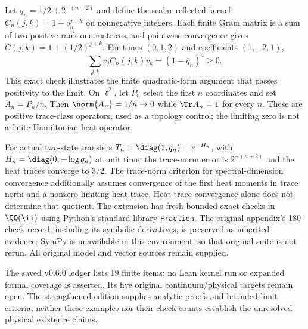 Let $q_n=1/2+2^{-(n+2)}$ and define the scalar reflected kernel $C_n(j,k)=1+q_n^{j+k}$ on nonnegative integers. Each finite Gram matrix is a sum of two positive rank-one matrices, and pointwise convergence gives $C(j,k)=1+(1/2)^{j+k}$. For times $(0,1,2)$ and coefficients $(1,-2,1)$,
\[
\sum_{j,k}v_jC_n(j,k)v_k=(1-q_n)^4\geq0.
\]
This exact check illustrates the finite quadratic-form argument that passes positivity to the limit.
On $\ell^2$, let $P_n$ select the first $n$ coordinates and set $A_n=P_n/n$. Then $\norm{A_n}=1/n\to0$ while $\Tr A_n=1$ for every $n$. These are positive trace-class operators, used as a topology control; the limiting zero is not a finite-Hamiltonian heat operator.

For actual two-state transfers $T_n=\diag(1,q_n)=e^{-H_n}$, with $H_n=\diag(0,-\log q_n)$ at unit time, the trace-norm error is $2^{-(n+2)}$ and the heat traces converge to $3/2$. The trace-norm criterion for spectral-dimension convergence additionally assumes convergence of the first heat moments in trace norm and a nonzero limiting heat trace. Heat-trace convergence alone does not determine that quotient.
The extension has fresh bounded exact checks in $\QQ(\ii)$ using Python's standard-library \texttt{Fraction}. The original appendix's 180-check record, including its symbolic derivatives, is preserved as inherited evidence: SymPy is unavailable in this environment, so that original suite is not rerun. All original model and vector sources remain supplied.

The saved v0.6.0 ledger lists 19 finite items; no Lean kernel run or expanded formal coverage is asserted. Its five original continuum/physical targets remain open. The strengthened edition supplies analytic proofs and bounded-limit criteria; neither these examples nor their check counts establish the unresolved physical existence claims.
